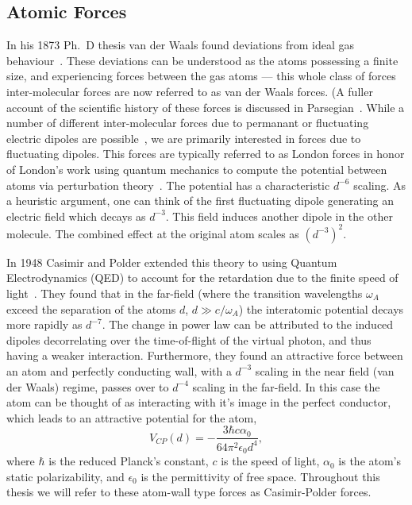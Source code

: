 
\subsection{Atomic Forces}

In his 1873 Ph.~D thesis van der Waals found deviations from ideal gas behaviour~\cite{vanderWaals}.
These deviations can be understood as the atoms possessing a finite size, and experiencing forces between the gas atoms 
--- this whole class of forces inter-molecular forces are now referred to as van der Waals forces.
(A fuller account of the scientific history of these forces is discussed in Parsegian~\cite{Parsegian2006}.
While a number of different inter-molecular forces due to permanant
 or fluctuating electric dipoles are possible~\cite{Israelachvili2011},
we are primarily interested in forces due to fluctuating dipoles.  
This forces are typically referred to as London forces in honor of London's work
 using quantum mechanics to compute the potential between atoms via perturbation theory~\cite{London1930}.  
The potential has a characteristic $d^{-6}$ scaling.  As a heuristic argument, one can think of
 the first fluctuating dipole generating an electric field which decays as $d^{-3}$.  This field induces another
dipole in the other molecule.  The combined effect at the original atom scales as $(d^{-3})^2$.  

In 1948 Casimir and Polder extended this theory to using Quantum Electrodynamics
(QED) to account for the retardation due to the finite speed of light~\cite{CasimirPolder1948}. 
They found that in the far-field 
(where the transition wavelengths $\omega_A$ exceed the separation of the atoms $d$, $d\gg c/\omega_A$)
the interatomic potential decays more rapidly as $d^{-7}$.  The change in power law can be 
attributed to the induced dipoles decorrelating over the time-of-flight of the virtual photon, 
and thus having a weaker interaction.  
Furthermore, they found an attractive force between an atom and perfectly conducting wall, with a $d^{-3}$ scaling
in the near field (van der Waals) regime, passes over to $d^{-4}$ scaling in the far-field.
In this case the atom can be thought of as interacting with it's image in the perfect conductor,   
which leads to an attractive potential for the atom,
\begin{equation}
  V_{CP}(d) =-\frac{3\hbar c\alpha_0}{64\pi^2\epsilon_0 d^4},
\end{equation}
where $\hbar$ is the reduced Planck's constant, $c$ is the speed of light, $\alpha_0$ is the atom's static polarizability,
and $\epsilon_0$ is the permittivity of free space.  Throughout this thesis we will refer to these
atom-wall type forces as Casimir-Polder forces.  

